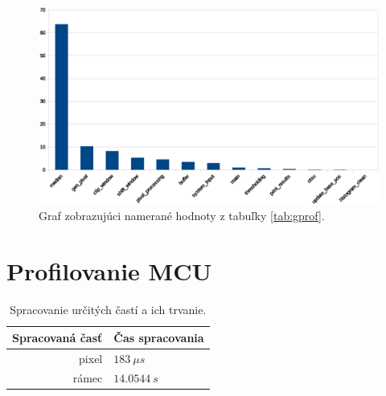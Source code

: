 \documentclass[11pt,a4paper]{article}
\begin{document}
\begin{figure}[H]
    \centering
    \includegraphics[scale=0.6]{graph.eps}
    \caption{Graf zobrazujúci namerané hodnoty z tabuľky \ref{tab:gprof}.}
    \label{fig:graf}
\end{figure}

\newpage
\section{Profilovanie MCU}

\begin{table}[H]
  \begin{center}
    \begin{tabular}{r|l}
        \multicolumn{1}{c|}{\textbf{Spracovaná časť}} & \multicolumn{1}{c}{\textbf{Čas spracovania}}\\
        \hline
        pixel & $183 \ \mu s$\\
        rámec & $14.0544 \ s$\\
    \end{tabular}
    \caption{Spracovanie určitých častí a ich trvanie.}
    \label{tab:process}
  \end{center}
\end{table}


%
%    
\end{document}
